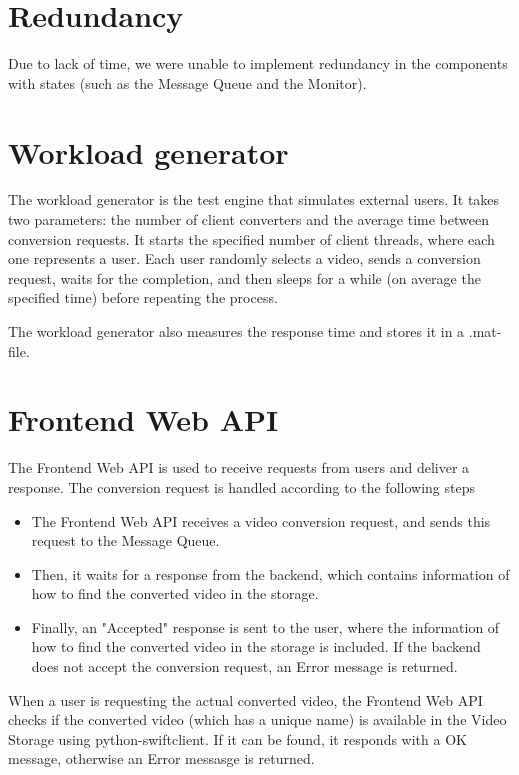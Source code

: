 \documentclass[a4paper, 10pt, english]{article}
\begin{document}
\section{Redundancy}
Due to lack of time, we were unable to implement redundancy in the components with states (such as the Message Queue and the Monitor).

\section{Workload generator} \label{sec:WG}
The workload generator is the test engine that simulates external users. It takes two parameters: the number of client converters and the average time between conversion requests. It starts the specified number of client threads, where each one represents a user. Each user randomly selects a video, sends a conversion request, waits for the completion, and then sleeps for a while (on average the specified time) before repeating the process.

The workload generator also measures the response time and stores it in a .mat-file.

\section{Frontend Web API} \label{sec:FE}
The Frontend Web API is used to receive requests from users and deliver a response. The conversion request is handled according to the following steps
\begin{itemize}
	\item The Frontend Web API receives a video conversion request, and sends this request to the Message Queue.
	\item Then, it waits for a response from the backend, which contains information of how to find the converted video in the storage.
	\item Finally, an "Accepted" response is sent to the user, where the information of how to find the converted video in the storage is included. If the backend does not accept the conversion request, an Error message is returned. 
\end{itemize}
When a user is requesting the actual converted video, the Frontend Web API checks if the converted video (which has a unique name) is available in the Video Storage using python-swiftclient. If it can be found, it responds with a OK message, otherwise an Error messasge is returned.
\end{document}
